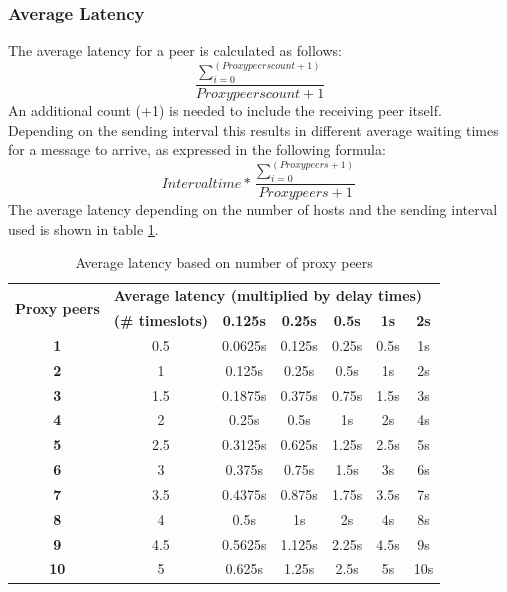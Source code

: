 \subsubsection{Average Latency}
The average latency for a peer is calculated as follows:
$$\frac{\sum\limits_{i=0}^{(Proxy peers count +1)}}{Proxy peers count + 1}$$
An additional count (+1) is needed to include the receiving peer itself.
Depending on the sending interval this results in different average
waiting times for a message to arrive, as expressed in
the following formula:
$$Intervaltime * \frac{\sum\limits_{i=0}^{(Proxy peers +1)}}{Proxy peers + 1}$$
The average latency depending on the number of hosts and the sending interval
used is shown in table \ref{avglatencypeers}.
\begin{longtable}{|c|c|c|c|c|c|c|}
\caption{Average latency based on number of proxy peers}
\label{avglatencypeers}\\
\hline
\multirow{2}{*}{\textbf{Proxy peers}} & \multicolumn{6}{|l|}{\textbf{Average latency (multiplied by delay times)}} \\
& \textbf{(\# timeslots)} & \textbf{0.125s} & \textbf{0.25s} & \textbf{0.5s} & \textbf{1s} & \textbf{2s}\\
\hline
\textbf{1} & 0.5 & 0.0625s & 0.125s & 0.25s & 0.5s & 1s\\
\hline
\textbf{2} & 1 & 0.125s & 0.25s & 0.5s & 1s & 2s\\
\hline
\textbf{3} & 1.5 & 0.1875s & 0.375s & 0.75s & 1.5s & 3s\\
\hline
\textbf{4} & 2 & 0.25s & 0.5s & 1s & 2s & 4s\\
\hline
\textbf{5} & 2.5 & 0.3125s & 0.625s & 1.25s & 2.5s & 5s\\
\hline
\textbf{6} & 3 & 0.375s & 0.75s & 1.5s & 3s & 6s\\
\hline
\textbf{7} & 3.5 & 0.4375s & 0.875s & 1.75s & 3.5s & 7s\\
\hline
\textbf{8} & 4 & 0.5s & 1s & 2s & 4s & 8s\\
\hline
\textbf{9} & 4.5 & 0.5625s & 1.125s & 2.25s & 4.5s & 9s\\
\hline
\textbf{10} & 5 & 0.625s & 1.25s & 2.5s & 5s & 10s\\
\hline
\end{longtable}
